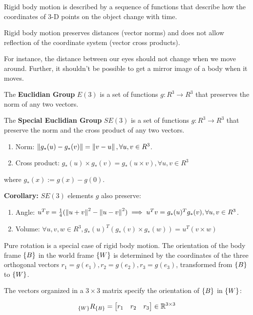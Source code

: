 Rigid body motion is described by a sequence of functions that describe how the coordinates of 3-D points on the object change with time.

Rigid body motion preserves distances (vector norms) and does not allow reflection of the coordinate system (vector cross products).

For instance, the distance between our eyes should not change when we move around. Further, it shouldn't be possible to get a mirror image of a body when it moves.

The \textbf{Euclidian Group} $E(3)$ is a set of functions $g: R^3\to R^3$ that preserves the norm of any two vectors.

The \textbf{Special Euclidian Group} $SE(3)$ is a set of functions $g: R^3\to R^3$ that preserve the norm and the cross product of any two vectors.

\begin{enumerate}
    \item Norm: $\left\lVert g_*(u) - g_*(v)\right\rVert = \left\lVert v-u\right\rVert, \forall u, v \in R^3$.
    \item Cross product: $g_*(u) \times g_*(v) = g_*(u\times v), \forall u, v \in R^3$
\end{enumerate}

where $g_*(x) := g(x) - g(0)$.

\textbf{Corollary:} $SE(3)$ elements $g$ also preserve:

\begin{enumerate}
    \item Angle: $u^Tv = \frac{1}{4} (\left\lVert u + v\right\rVert^2 - \left\lVert u-v\right\rVert^2) \implies u^Tv = g_*(u)^T g_*(v), \forall u, v \in R^3$.
    \item Volume: $\forall u, v, w \in R^3, g_*(u)^T(g_*(v)\times g_*(w))=u^T(v\times w)$
\end{enumerate}

Pure rotation is a special case of rigid body motion. The orientation of the body frame $\{B\}$ in the world frame $\{W\}$ is determined by the coordinates of the three orthogonal vectors $r_1 = g(e_1), r_2 = g(e_2), r_3 = g(e_3)$, transformed from $\{B\}$ to $\{W\}$.

The vectors organized in a $3\times 3$ matrix specify the orientation of $\{B\}$ in $\{W\}$:

\begin{equation*}
    {}_{\{W\}}R_{\{B\}} = \begin{bmatrix}
        r_1 & r_2 & r_3
    \end{bmatrix} \in \mathbb{R}^{3\times 3}
\end{equation*}

